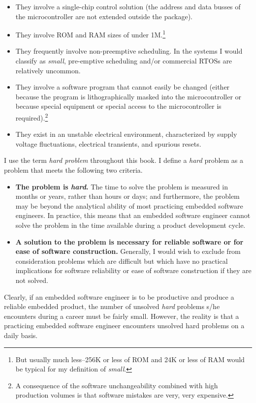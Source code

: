 \begin{itemize}
\item They
involve a single-chip control solution (the address and data busses of
the microcontroller are not extended outside the package).
\item They
involve ROM and RAM sizes of under 1M.\footnote{But usually much less--256K or less of ROM and 24K
or less of RAM would be typical for my definition of \emph{small}.}
\item They frequently involve non-preemptive scheduling.  In the systems I would
classify as \emph{small}, pre-emptive scheduling and/or commercial
RTOSs are relatively uncommon.
\item They involve a software
program that cannot easily be changed (either because the program
is lithographically masked into the microcontroller or because special
equipment or special access to the microcontroller is required).\footnote{A consequence of the
software unchangeability
combined with high production volumes is
that software mistakes are very, very expensive.}
\item They exist in an unstable electrical environment,
characterized by supply voltage fluctuations,
electrical transients, and spurious resets.
\end{itemize}

I use the term \emph{hard problem} throughout this book.
I define a
\emph{hard} problem as a problem that
meets the following two criteria.
\begin{itemize}
   \item \textbf{The problem is \emph{hard}.}
         The time to solve the problem is measured in
         months or years, rather than hours or days; and furthermore,
         the problem may be beyond the analytical ability of
         most practicing embedded software engineers.  In practice, this means that
         an embedded software engineer cannot solve the problem in the time
         available during a product development cycle.
   \item \textbf{A solution to the problem is necessary for
         reliable software or for ease of software construction.}
         Generally, I would wish to exclude from consideration
         problems which are difficult but which have no practical implications
         for software reliability or ease of software construction
         if they are not solved.
\end{itemize}

Clearly, if an embedded software engineer is to be productive and
produce a reliable embedded product, the number of unsolved
\emph{hard} problems s/he encounters during a career must
be fairly small.  However, the reality is that a practicing
embedded software engineer encounters unsolved hard problems
on a daily basis.

